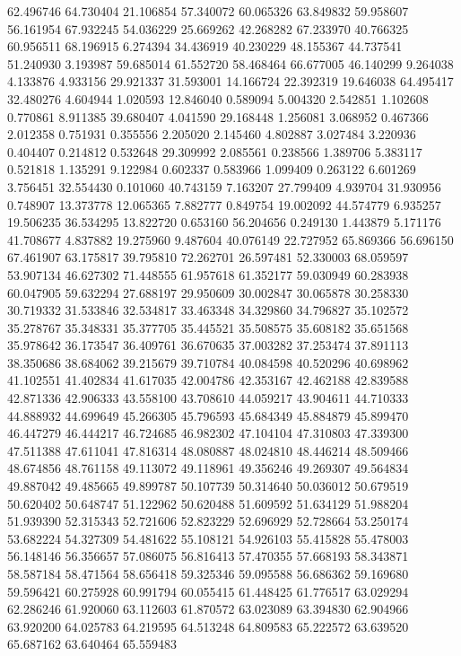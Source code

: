 62.496746
64.730404
21.106854
57.340072
60.065326
63.849832
59.958607
56.161954
67.932245
54.036229
25.669262
42.268282
67.233970
40.766325
60.956511
68.196915
6.274394
34.436919
40.230229
48.155367
44.737541
51.240930
3.193987
59.685014
61.552720
58.468464
66.677005
46.140299
9.264038
4.133876
4.933156
29.921337
31.593001
14.166724
22.392319
19.646038
64.495417
32.480276
4.604944
1.020593
12.846040
0.589094
5.004320
2.542851
1.102608
0.770861
8.911385
39.680407
4.041590
29.168448
1.256081
3.068952
0.467366
2.012358
0.751931
0.355556
2.205020
2.145460
4.802887
3.027484
3.220936
0.404407
0.214812
0.532648
29.309992
2.085561
0.238566
1.389706
5.383117
0.521818
1.135291
9.122984
0.602337
0.583966
1.099409
0.263122
6.601269
3.756451
32.554430
0.101060
40.743159
7.163207
27.799409
4.939704
31.930956
0.748907
13.373778
12.065365
7.882777
0.849754
19.002092
44.574779
6.935257
19.506235
36.534295
13.822720
0.653160
56.204656
0.249130
1.443879
5.171176
41.708677
4.837882
19.275960
9.487604
40.076149
22.727952
65.869366
56.696150
67.461907
63.175817
39.795810
72.262701
26.597481
52.330003
68.059597
53.907134
46.627302
71.448555
61.957618
61.352177
59.030949
60.283938
60.047905
59.632294
27.688197
29.950609
30.002847
30.065878
30.258330
30.719332
31.533846
32.534817
33.463348
34.329860
34.796827
35.102572
35.278767
35.348331
35.377705
35.445521
35.508575
35.608182
35.651568
35.978642
36.173547
36.409761
36.670635
37.003282
37.253474
37.891113
38.350686
38.684062
39.215679
39.710784
40.084598
40.520296
40.698962
41.102551
41.402834
41.617035
42.004786
42.353167
42.462188
42.839588
42.871336
42.906333
43.558100
43.708610
44.059217
43.904611
44.710333
44.888932
44.699649
45.266305
45.796593
45.684349
45.884879
45.899470
46.447279
46.444217
46.724685
46.982302
47.104104
47.310803
47.339300
47.511388
47.611041
47.816314
48.080887
48.024810
48.446214
48.509466
48.674856
48.761158
49.113072
49.118961
49.356246
49.269307
49.564834
49.887042
49.485665
49.899787
50.107739
50.314640
50.036012
50.679519
50.620402
50.648747
51.122962
50.620488
51.609592
51.634129
51.988204
51.939390
52.315343
52.721606
52.823229
52.696929
52.728664
53.250174
53.682224
54.327309
54.481622
55.108121
54.926103
55.415828
55.478003
56.148146
56.356657
57.086075
56.816413
57.470355
57.668193
58.343871
58.587184
58.471564
58.656418
59.325346
59.095588
56.686362
59.169680
59.596421
60.275928
60.991794
60.055415
61.448425
61.776517
63.029294
62.286246
61.920060
63.112603
61.870572
63.023089
63.394830
62.904966
63.920200
64.025783
64.219595
64.513248
64.809583
65.222572
63.639520
65.687162
63.640464
65.559483
